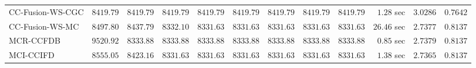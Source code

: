 \begin{table}[H]
\begin{tabular}{lrrrrrrrrrrr}
    CC-Fusion-WS-CGC & $      8419.79$ & $      8419.79$ & $      8419.79$ & $      8419.79$ & $      8419.79$ & $      8419.79$ & $      8419.79$ & $      8419.79$ & $         1.28$ sec    & $       3.0286$  & $       0.7642$ \\ 
     CC-Fusion-WS-MC & $      8497.80$ & $      8437.79$ & $      8332.10$ & $      8331.63$ & $      8331.63$ & $      8331.63$ & $      8331.63$ & $      8331.63$ & $        26.46$ sec    & $       2.7377$  & $       0.8137$ \\ 
\cmidrule{1-1} 
           MCR-CCFDB & $      9520.92$ & $      8333.88$ & $      8333.88$ & $      8333.88$ & $      8333.88$ & $      8333.88$ & $      8333.88$ & $      8333.88$ & $         0.85$ sec    & $       2.7379$  & $       0.8137$ \\ 
\cmidrule{1-1} 
           MCI-CCIFD & $      8555.05$ & $      8423.16$ & $      8331.63$ & $      8331.63$ & $      8331.63$ & $      8331.63$ & $      8331.63$ & $      8331.63$ & $         1.38$ sec    & $       2.7365$  & $       0.8137$ \\ 
\bottomrule
\end{tabular}
\end{table}

